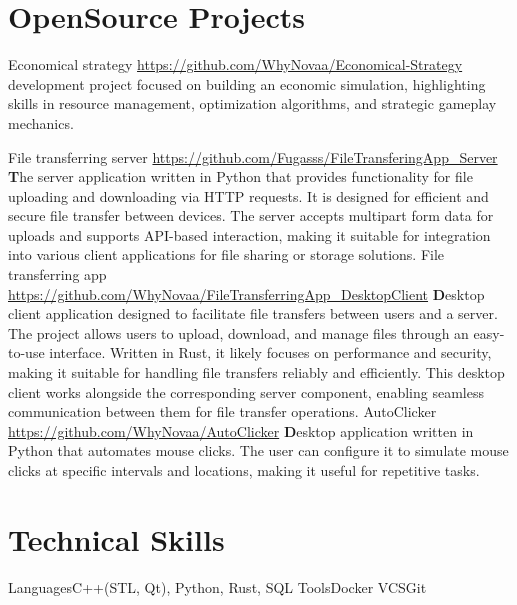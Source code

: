 \documentclass[11pt,a4paper]{moderncv}
\begin{document}
\maketitle

\section{OpenSource Projects}
  \cvline
    {Economical strategy}
    {\url{https://github.com/WhyNovaa/Economical-Strategy}\newline{}
    \textbfgame development project focused on building an economic simulation, highlighting skills in resource management, optimization algorithms, and strategic gameplay mechanics.\newline{}
    }

  \cvline
    {File transferring server}
    {\url{https://github.com/Fugasss/FileTransferingApp_Server}\newline{}
    \textbf
    The server application written in Python that provides functionality for file uploading and downloading via HTTP requests. It is designed for efficient and secure file transfer between devices. The server accepts multipart form data for uploads and supports API-based interaction, making it suitable for integration into various client applications for file sharing or storage solutions.\newline{}
    }
  \cvline
    {File transferring app}
    {\url{https://github.com/WhyNovaa/FileTransferringApp_DesktopClient}\newline{}
    \textbf
    Desktop client application designed to facilitate file transfers between users and a server. The project allows users to upload, download, and manage files through an easy-to-use interface. Written in Rust, it likely focuses on performance and security, making it suitable for handling file transfers reliably and efficiently. This desktop client works alongside the corresponding server component, enabling seamless communication between them for file transfer operations.\newline{}
    }
  \cvline 
    {AutoClicker}
    {\url{https://github.com/WhyNovaa/AutoClicker}\newline{}
    \textbf Desktop application written in Python that automates mouse clicks. The user can configure it to simulate mouse clicks at specific intervals and locations, making it useful for repetitive tasks.\newline{}
    }
    
\section{Technical Skills}
\cvline
  {Languages}{C++(STL, Qt), Python, Rust, SQL}
\cvline 
  {Tools}{Docker}
\cvline
  {VCS}{Git}
\end{document}
